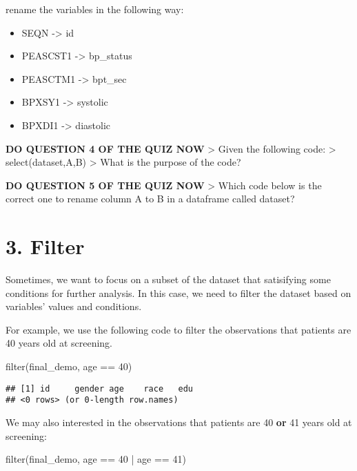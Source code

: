 \documentclass[
]{book}
\newenvironment{Shaded}{\begin{snugshade}}{\end{snugshade}}
\newcommand{\DecValTok}[1]{\textcolor[rgb]{0.00,0.00,0.81}{#1}}
\newcommand{\FunctionTok}[1]{\textcolor[rgb]{0.00,0.00,0.00}{#1}}
\newcommand{\NormalTok}[1]{#1}
\newcommand{\SpecialCharTok}[1]{\textcolor[rgb]{0.00,0.00,0.00}{#1}}
\providecommand{\tightlist}{%
  \setlength{\itemsep}{0pt}\setlength{\parskip}{0pt}}
\begin{document}
rename the variables in the following way:

\begin{itemize}
\tightlist
\item
  SEQN -\textgreater{} id
\item
  PEASCST1 -\textgreater{} bp\_status
\item
  PEASCTM1 -\textgreater{} bpt\_sec
\item
  BPXSY1 -\textgreater{} systolic
\item
  BPXDI1 -\textgreater{} diastolic
\end{itemize}

\textbf{DO QUESTION 4 OF THE QUIZ NOW}
\textgreater{} Given the following code:
\textgreater{} select(dataset,A,B)
\textgreater{} What is the purpose of the code?

\textbf{DO QUESTION 5 OF THE QUIZ NOW}
\textgreater{} Which code below is the correct one to rename column A to B in a dataframe called dataset?

\hypertarget{filter}{%
\section{3. Filter}\label{filter}}

Sometimes, we want to focus on a subset of the dataset that satisifying some conditions for further analysis. In this case, we need to filter the dataset based on variables' values and conditions.

For example, we use the following code to filter the observations that patients are 40 years old at screening.

\begin{Shaded}
\begin{Highlighting}[]
\FunctionTok{filter}\NormalTok{(final\_demo, age }\SpecialCharTok{==} \DecValTok{40}\NormalTok{)}
\end{Highlighting}
\end{Shaded}

\begin{verbatim}
## [1] id     gender age    race   edu
## <0 rows> (or 0-length row.names)
\end{verbatim}

We may also interested in the observations that patients are 40 \textbf{or} 41 years old at screening:

\begin{Shaded}
\begin{Highlighting}[]
\FunctionTok{filter}\NormalTok{(final\_demo, age }\SpecialCharTok{==} \DecValTok{40} \SpecialCharTok{|}\NormalTok{ age }\SpecialCharTok{==} \DecValTok{41}\NormalTok{)}
\end{Highlighting}
\end{Shaded}
\end{document}
